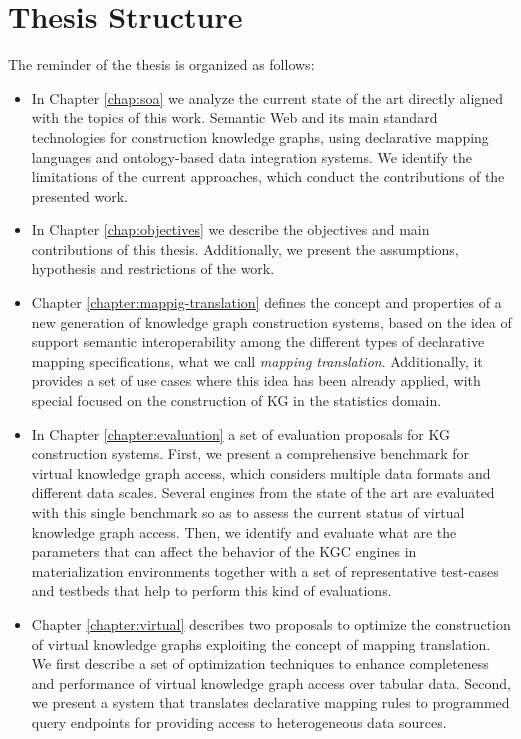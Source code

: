 \section{Thesis Structure}
\label{sec:thesisstructure}
The reminder of the thesis is organized as follows:
\begin{itemize}
    \item In Chapter \ref{chap:soa} we analyze the current state of the art directly aligned with the topics of this work. Semantic Web and its main standard technologies for construction knowledge graphs, using declarative mapping languages and ontology-based data integration systems. We identify the limitations of the current approaches, which conduct the contributions of the presented work.
    \item In Chapter \ref{chap:objectives} we describe the objectives and main contributions of this thesis. Additionally, we present the assumptions, hypothesis and restrictions of the work.
    \item Chapter \ref{chapter:mappig-translation} defines the concept and properties of a new generation of knowledge graph construction systems, based on the idea of support semantic interoperability among the different types of declarative mapping specifications, what we call \textit{mapping translation}. Additionally, it provides a set of use cases where this idea has been already applied, with special focused on the construction of KG in the statistics domain.
    \item In Chapter \ref{chapter:evaluation} a set of evaluation proposals for KG construction systems. First, we present a comprehensive benchmark for virtual knowledge graph access, which considers multiple data formats and different data scales. Several engines from the state of the art are evaluated with this single benchmark so as to assess the current status of virtual knowledge graph access. Then, we identify and evaluate what are the parameters that can affect the behavior of the KGC engines in materialization environments together with a set of representative test-cases and testbeds that help to perform this kind of evaluations.
    \item Chapter \ref{chapter:virtual} describes two proposals to optimize the construction of virtual knowledge graphs exploiting the concept of mapping translation. We first describe a set of optimization techniques to enhance completeness and performance of virtual knowledge graph access over tabular data. Second, we present a system that translates declarative mapping rules to programmed query endpoints for providing access to heterogeneous data sources.

\end{itemize}

